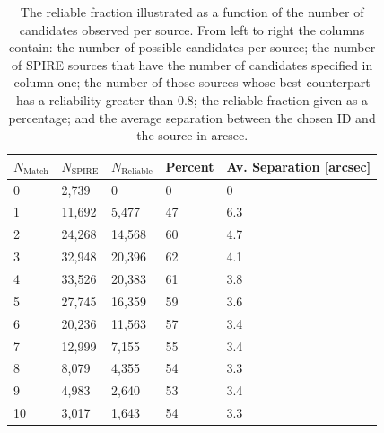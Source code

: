 \begin{table}
    \centering
    \begin{tabular}{|p{2.5cm}|p{2.5cm}|p{2.5cm}|p{2.5cm}|p{4cm}|}
        \hline
        $N_{\textrm{Match}}$ & $N_{\textrm{SPIRE}}$ & $N_{\textrm{Reliable}}$ & Percent & Av. Separation [arcsec] \\
        \hline
        \hline
        0 & 2,739 & 0 & 0 & 0 \\
        1 & 11,692 & 5,477 & 47 & 6.3 \\
        2 & 24,268 & 14,568 & 60 & 4.7 \\
        3 & 32,948 & 20,396 & 62 & 4.1 \\
        4 & 33,526 & 20,383 & 61 & 3.8 \\
        5 & 27,745 & 16,359 & 59 & 3.6 \\
        6 & 20,236 & 11,563 & 57 & 3.4 \\
        7 & 12,999 & 7,155 & 55 & 3.4 \\
        8 & 8,079 & 4,355 & 54 & 3.3 \\
        9 & 4,983 & 2,640 & 53 & 3.4 \\
        10 & 3,017 & 1,643 & 54 & 3.3 \\
        \hline
    \end{tabular}
    \caption{The reliable fraction illustrated as a function of the number of candidates observed per source. From left to right the columns contain: the number of possible candidates per source; the number of SPIRE sources that have the number of candidates specified in column one; the number of those sources whose best counterpart has a reliability greater than 0.8; the reliable fraction given as a percentage; and the average separation between the chosen ID and the source in arcsec.}
    \label{tab:multiplicity}
    \end{table}

